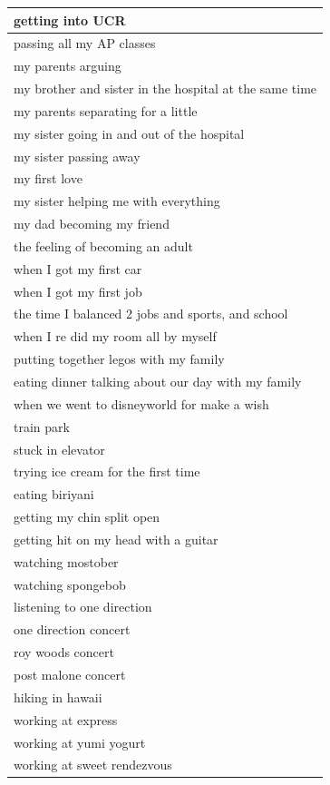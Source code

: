 \documentclass[
  .7em,
  letterpaper,
  DIV=11,
  numbers=noendperiod]{scrartcl}
\begin{document}
\begin{table}
\begin{tabular}{l}
\hline
getting into UCR\\
\hline
passing all my AP classes\\
\hline
my parents arguing\\
\hline
my brother and sister in the hospital at the same time\\
\hline
my parents separating for a little\\
\hline
my sister going in and out of the hospital\\
\hline
my sister passing away\\
\hline
my first love\\
\hline
my sister helping me with everything\\
\hline
my dad becoming my friend\\
\hline
the feeling of becoming an adult\\
\hline
when I got my first car\\
\hline
when I got my first job\\
\hline
the time I balanced 2 jobs and sports, and school\\
\hline
when I re did my room all by myself\\
\hline
putting together legos with my family\\
\hline
eating dinner talking about our day with my family\\
\hline
when we went to disneyworld for make a wish\\
\hline
train park\\
\hline
stuck in elevator\\
\hline
trying ice cream for the first time\\
\hline
eating biriyani\\
\hline
getting my chin split open\\
\hline
getting hit on my head with a guitar\\
\hline
watching mostober\\
\hline
watching spongebob\\
\hline
listening to one direction\\
\hline
one direction concert\\
\hline
roy woods concert\\
\hline
post malone concert\\
\hline
hiking in hawaii\\
\hline
working at express\\
\hline
working at yumi yogurt\\
\hline
working at sweet rendezvous\\

\end{tabular}
\end{table}
\end{document}
